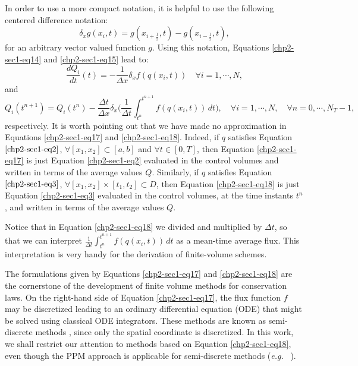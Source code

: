 In order to use a more compact notation, it is helpful to use the following centered difference notation:
\begin{equation}
	\label{chp2-sec1-eq16}
	\delta_x {g}(x_i,t) = 
	{g}(x_{i+\frac{1}{2}},t) - 
	{g}(x_{i-\frac{1}{2}},t),
\end{equation}
for an arbitrary vector valued function ${g}$. 
Using this notation, Equations \eqref{chp2-sec1-eq14}
and \eqref{chp2-sec1-eq15} lead to:
\begin{equation}
        \label{chp2-sec1-eq17}
        \frac{dQ_i}{dt}(t) = -\frac{1}{\Delta x}
	\delta_x {f}({q}(x_{i},t))
        \quad \forall i = 1, \cdots, N,
\end{equation}
and
\begin{equation}
        \label{chp2-sec1-eq18}
        {Q}_i(t^{n+1}) =  {Q}_i(t^{n}) -
	\frac{\Delta t}{  \Delta x} \delta _x\bigg( \frac{1}{\Delta t}\int_{t^{n}}^{t^{n+1}}
        {f}({q}(x_{i}, t)) \,dt \bigg),
        \quad \forall i = 1, \cdots, N,
        \quad \forall n = 0, \cdots, N_T-1,
\end{equation}
respectively.
It is worth pointing out that we have made no approximation in Equations
\eqref{chp2-sec1-eq17} and \eqref{chp2-sec1-eq18}. Indeed, if ${q}$ satisfies Equation
$\eqref{chp2-sec1-eq2}$, $\forall [x_1, x_2] \subset [a,b]$ and $\forall t \in [0,T]$,
then Equation \eqref{chp2-sec1-eq17} is just Equation
\eqref{chp2-sec1-eq2} evaluated in the control volumes and written
in terms of the average values ${Q}$. 
Similarly, if ${q}$ satisfies Equation
$\eqref{chp2-sec1-eq3}$, $\forall [x_1, x_2] \times [t_1, t_2] \subset D$,
then Equation \eqref{chp2-sec1-eq18} is just Equation
\eqref{chp2-sec1-eq3} evaluated in the control volumes,
at the time instants $t^{n}$, and written
in terms of the average values ${Q}$.

Notice that in Equation \eqref{chp2-sec1-eq18} we divided and multiplied by $\Delta t$, so that 
we can interpret $\frac{1}{\Delta t}\int_{t^{n}}^{t^{n+1}}
{f}({q}(x_{i}, t)) \,dt $ as a mean-time average flux.
This interpretation is very handy for the derivation of finite-volume schemes.

The formulations given by Equations \eqref{chp2-sec1-eq17} and \eqref{chp2-sec1-eq18} are the cornerstone 
of the development of finite volume methods for conservation laws. 
On the right-hand side of Equation \eqref{chp2-sec1-eq17}, the flux function ${f}$ 
may be discretized leading to an ordinary differential equation (ODE)
that might be solved using classical ODE integrators.
These methods are known as semi-discrete methods \citep{leveque:2002}, since only the spatial coordinate is discretized.
In this work, we shall restrict our attention to methods based on Equation \eqref{chp2-sec1-eq18},
even though the PPM approach is applicable for semi-discrete methods (\textit{e.g.} \ \citet{suresh:1997}).

